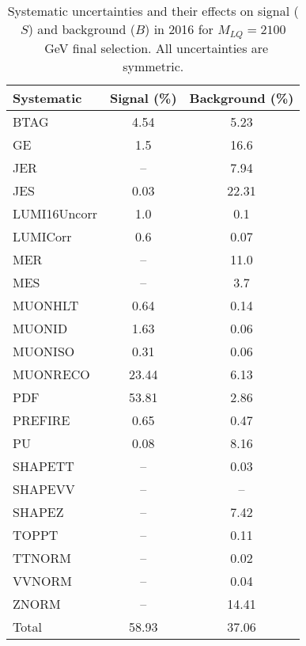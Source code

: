 \begin{table}[htbp]
\begin{center}
\caption{Systematic uncertainties and their effects on signal ($S$) and background ($B$) in 2016 for $M_{LQ}=2100$~GeV final selection. All uncertainties are symmetric.}
\begin{tabular}{lcc}
\hline\hline
Systematic & Signal (\%) & Background (\%) \\ \hline 
BTAG & 4.54 & 5.23\\ 
GE & 1.5 & 16.6\\ 
JER & -- & 7.94\\ 
JES & 0.03 & 22.31\\ 
LUMI16Uncorr & 1.0 & 0.1\\ 
LUMICorr & 0.6 & 0.07\\ 
MER & -- & 11.0\\ 
MES & -- & 3.7\\ 
MUONHLT & 0.64 & 0.14\\ 
MUONID & 1.63 & 0.06\\ 
MUONISO & 0.31 & 0.06\\ 
MUONRECO & 23.44 & 6.13\\ 
PDF & 53.81 & 2.86\\ 
PREFIRE & 0.65 & 0.47\\ 
PU & 0.08 & 8.16\\ 
SHAPETT & -- & 0.03\\ 
SHAPEVV & -- & --\\ 
SHAPEZ & -- & 7.42\\ 
TOPPT & -- & 0.11\\ 
TTNORM & -- & 0.02\\ 
VVNORM & -- & 0.04\\ 
ZNORM & -- & 14.41\\ 
Total & 58.93 & 37.06\\ \hline \hline
\end{tabular}
\label{tab:SysUncertainties_uujj_2100}
\end{center}
\end{table}

